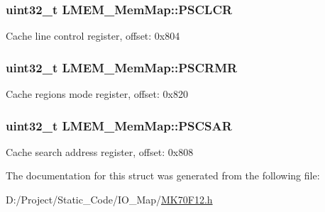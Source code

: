 \subsubsection[{P\+S\+C\+L\+C\+R}]{\setlength{\rightskip}{0pt plus 5cm}uint32\+\_\+t L\+M\+E\+M\+\_\+\+Mem\+Map\+::\+P\+S\+C\+L\+C\+R}\label{struct_l_m_e_m___mem_map_a9002773a5254b5d1ebb9a46218ef21c4}
Cache line control register, offset\+: 0x804 \hypertarget{struct_l_m_e_m___mem_map_a06dad54d3dcb178443d2c9b0d5ae2496}{}
\subsubsection[{P\+S\+C\+R\+M\+R}]{\setlength{\rightskip}{0pt plus 5cm}uint32\+\_\+t L\+M\+E\+M\+\_\+\+Mem\+Map\+::\+P\+S\+C\+R\+M\+R}\label{struct_l_m_e_m___mem_map_a06dad54d3dcb178443d2c9b0d5ae2496}
Cache regions mode register, offset\+: 0x820 \hypertarget{struct_l_m_e_m___mem_map_ad54ebfe0c32863df5645bc4416dfe3dc}{}
\subsubsection[{P\+S\+C\+S\+A\+R}]{\setlength{\rightskip}{0pt plus 5cm}uint32\+\_\+t L\+M\+E\+M\+\_\+\+Mem\+Map\+::\+P\+S\+C\+S\+A\+R}\label{struct_l_m_e_m___mem_map_ad54ebfe0c32863df5645bc4416dfe3dc}
Cache search address register, offset\+: 0x808 

The documentation for this struct was generated from the following file\+:\begin{DoxyCompactItemize}
\item 
D\+:/\+Project/\+Static\+\_\+\+Code/\+I\+O\+\_\+\+Map/\hyperlink{_m_k70_f12_8h}{M\+K70\+F12.\+h}\end{DoxyCompactItemize}
